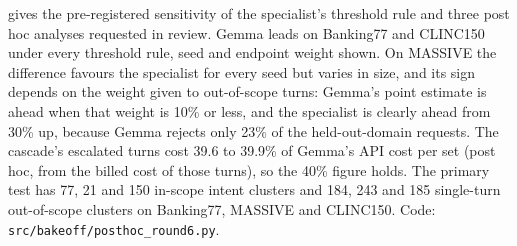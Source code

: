 \documentclass[11pt]{article}
\begin{document}
 gives the pre-registered sensitivity of the specialist's threshold rule and three post hoc analyses requested in review. Gemma leads on Banking77 and CLINC150 under every threshold rule, seed and endpoint weight shown. On MASSIVE the difference favours the specialist for every seed but varies in size, and its sign depends on the weight given to out-of-scope turns: Gemma's point estimate is ahead when that weight is 10\% or less, and the specialist is clearly ahead from 30\% up, because Gemma rejects only 23\% of the held-out-domain requests. The cascade's escalated turns cost 39.6 to 39.9\% of Gemma's API cost per set (post hoc, from the billed cost of those turns), so the 40\% figure holds. The primary test has 77, 21 and 150 in-scope intent clusters and 184, 243 and 185 single-turn out-of-scope clusters on Banking77, MASSIVE and CLINC150. Code: \texttt{src/bakeoff/posthoc\_round6.py}.
\end{document}
